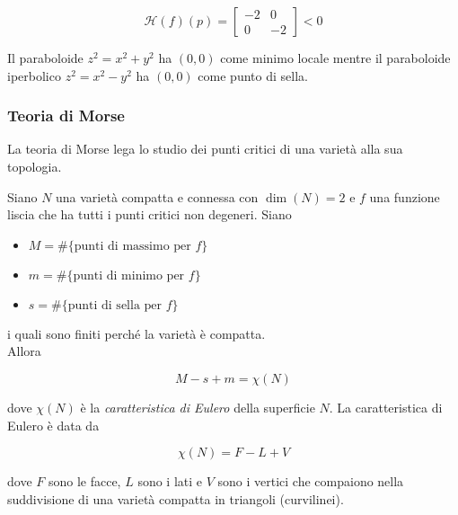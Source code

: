 \begin{equation}
	\mathcal{H}(f)(p) = \begin{bmatrix} -2 & 0 \\ 0 & -2 \end{bmatrix} < 0
\end{equation}

Il paraboloide $ z^{2} = x^{2} + y^{2} $ ha $ (0,0) $ come minimo locale mentre il paraboloide iperbolico $ z^{2} = x^{2} - y^{2} $ ha $ (0,0) $ come punto di sella.

\subsubsection{Teoria di Morse}

La teoria di Morse lega lo studio dei punti critici di una varietà alla sua topologia.

\begin{theorem}
	Siano $ N $ una varietà compatta e connessa con $ \dim(N)=2 $ e $ f $ una funzione liscia che ha tutti i punti critici non degeneri. Siano
	
	\begin{itemize}
		\item $ M = \# \{ \text{punti di massimo per } f \} $
		
		\item $ m = \# \{ \text{punti di minimo per } f \} $
		
		\item $ s = \# \{ \text{punti di sella per } f \} $
	\end{itemize}

	i quali sono finiti perché la varietà è compatta.\\
	Allora
	
	\begin{equation}
		M - s + m = \chi(N)
	\end{equation}

	dove $ \chi(N) $ è la \textit{caratteristica di Eulero} della superficie $ N $. La caratteristica di Eulero è data da
	
	\begin{equation}
		\chi(N) = F - L + V
	\end{equation}

	dove $ F $ sono le facce, $ L $ sono i lati e $ V $ sono i vertici che compaiono nella suddivisione di una varietà compatta in triangoli (curvilinei).
\end{theorem}

